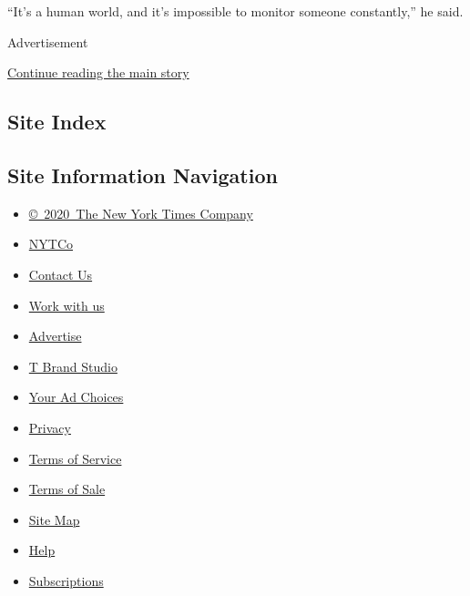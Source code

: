 ``It's a human world, and it's impossible to monitor someone
constantly,'' he said.

Advertisement

\protect\hyperlink{after-bottom}{Continue reading the main story}

\hypertarget{site-index}{%
\subsection{Site Index}\label{site-index}}

\hypertarget{site-information-navigation}{%
\subsection{Site Information
Navigation}\label{site-information-navigation}}

\begin{itemize}
\tightlist
\item
  \href{https://help.nytimes3xbfgragh.onion/hc/en-us/articles/115014792127-Copyright-notice}{©~2020~The
  New York Times Company}
\end{itemize}

\begin{itemize}
\tightlist
\item
  \href{https://www.nytco.com/}{NYTCo}
\item
  \href{https://help.nytimes3xbfgragh.onion/hc/en-us/articles/115015385887-Contact-Us}{Contact
  Us}
\item
  \href{https://www.nytco.com/careers/}{Work with us}
\item
  \href{https://nytmediakit.com/}{Advertise}
\item
  \href{http://www.tbrandstudio.com/}{T Brand Studio}
\item
  \href{https://www.nytimes3xbfgragh.onion/privacy/cookie-policy\#how-do-i-manage-trackers}{Your
  Ad Choices}
\item
  \href{https://www.nytimes3xbfgragh.onion/privacy}{Privacy}
\item
  \href{https://help.nytimes3xbfgragh.onion/hc/en-us/articles/115014893428-Terms-of-service}{Terms
  of Service}
\item
  \href{https://help.nytimes3xbfgragh.onion/hc/en-us/articles/115014893968-Terms-of-sale}{Terms
  of Sale}
\item
  \href{https://spiderbites.nytimes3xbfgragh.onion}{Site Map}
\item
  \href{https://help.nytimes3xbfgragh.onion/hc/en-us}{Help}
\item
  \href{https://www.nytimes3xbfgragh.onion/subscription?campaignId=37WXW}{Subscriptions}
\end{itemize}
